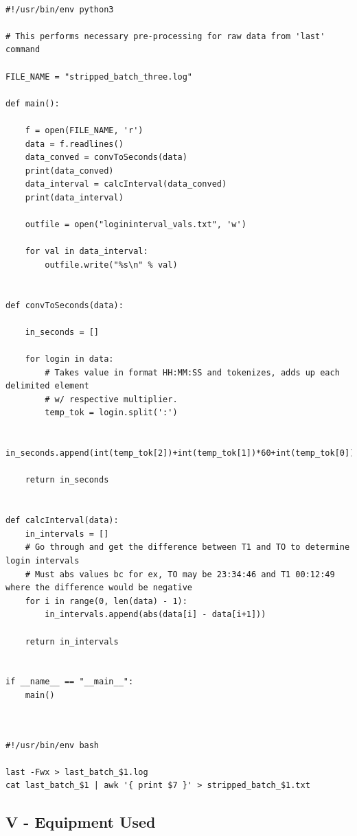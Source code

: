 \documentclass[10pt]{report}
\begin{document}
\begin{lstlisting}

#!/usr/bin/env python3

# This performs necessary pre-processing for raw data from 'last' command

FILE_NAME = "stripped_batch_three.log"

def main():

    f = open(FILE_NAME, 'r')
    data = f.readlines()
    data_conved = convToSeconds(data)
    print(data_conved)
    data_interval = calcInterval(data_conved)
    print(data_interval)

    outfile = open("logininterval_vals.txt", 'w')

    for val in data_interval:
        outfile.write("%s\n" % val)


def convToSeconds(data):

    in_seconds = []

    for login in data:
        # Takes value in format HH:MM:SS and tokenizes, adds up each delimited element
        # w/ respective multiplier.
        temp_tok = login.split(':')

        in_seconds.append(int(temp_tok[2])+int(temp_tok[1])*60+int(temp_tok[0])*3600)

    return in_seconds


def calcInterval(data):
    in_intervals = []
    # Go through and get the difference between T1 and TO to determine login intervals
    # Must abs values bc for ex, TO may be 23:34:46 and T1 00:12:49 where the difference would be negative
    for i in range(0, len(data) - 1):
        in_intervals.append(abs(data[i] - data[i+1]))

    return in_intervals


if __name__ == "__main__":
    main()


\end{lstlisting}




\lstset{language=Bash}

\begin{lstlisting}

#!/usr/bin/env bash

last -Fwx > last_batch_$1.log
cat last_batch_$1 | awk '{ print $7 }' > stripped_batch_$1.txt

\end{lstlisting}



\subsection*{V - Equipment Used}
\end{document}
